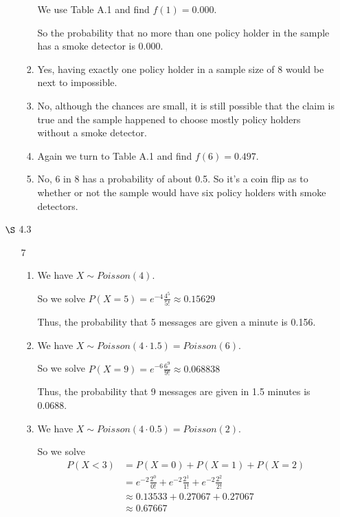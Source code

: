 \documentclass[12pt,letterpaper]{article}
\begin{document}
\begin{enumerate}
\begin{enumerate}
\begin{enumerate}[label=(\arabic*)]
              We use Table A.1 and find $f(1) = 0.000$.

              So the probability that no more than one policy holder in the sample has a smoke detector is 0.000.
            \item
              Yes, having exactly one policy holder in a sample size of 8 would be next to impossible.
            \item
              No, although the chances are small,
              it is still possible that the claim is true and
              the sample happened to choose mostly policy holders without a smoke detector.
            \item

              Again we turn to Table A.1 and find $f(6) = 0.497$.
            \item

              No, 6 in 8 has a probability of about 0.5.
              So it's a coin flip as to whether or not the sample would have six policy holders with smoke detectors.
          \end{enumerate}
      \end{enumerate}
    \item [$\S$ 4.3]
      \begin{enumerate}
        \item [7]
          \begin{enumerate}[label=(\arabic*)]
            \item
              We have $X \sim Poisson(4)$.

              So we solve $P(X = 5) = e^{-4}\frac{4^5}{5!} \approx 0.15629$

              Thus, the probability that 5 messages are given a minute is 0.156.
            \item
              We have $X \sim Poisson(4 \cdot 1.5) = Poisson(6)$.

              So we solve $P(X = 9) = e^{-6}\frac{6^9}{9!} \approx 0.068838$

              Thus, the probability that 9 messages are given in 1.5 minutes is 0.0688.
            \item
              We have $X \sim Poisson(4 \cdot 0.5) = Poisson(2)$.

              So we solve
              \begin{align*}
                P(X < 3) &= P(X = 0) + P(X = 1) + P(X = 2) \\
                &= e^{-2}\frac{2^0}{0!} + e^{-2}\frac{2^1}{1!} + e^{-2}\frac{2^2}{2!} \\
                &\approx 0.13533 + 0.27067 + 0.27067 \\
                &\approx 0.67667
              \end{align*}


\end{enumerate}
\end{enumerate}
\end{enumerate}
\end{document}
